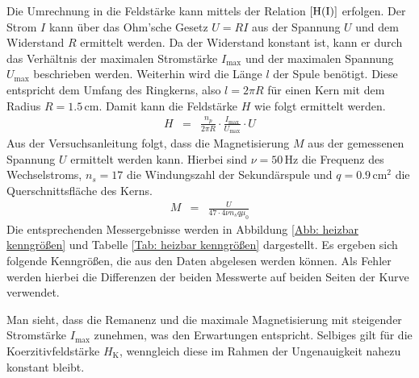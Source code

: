 \documentclass[12pt,a4paper]{scrartcl}
\numberwithin{equation}{section} %
\begin{document}
Die Umrechnung in die Feldstärke kann mittels der Relation $\eqref{H(I)}$ erfolgen. Der Strom $I$ kann über das Ohm'sche Gesetz $U=RI$ aus der Spannung $U$ und dem Widerstand $R$ ermittelt werden. Da der Widerstand konstant ist, kann er durch das Verhältnis der maximalen Stromstärke $I_\mathrm{max}$ und der maximalen Spannung $U_\mathrm{max}$ beschrieben werden. Weiterhin wird die Länge $l$ der Spule benötigt. Diese entspricht dem Umfang des Ringkerns, also $l=2\pi R$ für einen Kern mit dem Radius $R=1.5\mathrm{\,cm}$. Damit kann die Feldstärke $H$ wie folgt ermittelt werden.
\begin{eqnarray}
    H &=&
        \frac{n_p}{2\pi R} \cdot \frac{I_\mathrm{max}}{U_\mathrm{max}} \cdot U
        \label{H}
\end{eqnarray}
Aus der Versuchsanleitung \cite{Uni} folgt, dass die Magnetisierung $M$ aus der gemessenen Spannung $U$ ermittelt werden kann. Hierbei sind $\nu=\mathrm{50\,Hz}$ die Frequenz des Wechselstroms, $n_s=17$ die Windungszahl der Sekundärspule und $q = \mathrm{0.9\,cm^2}$ die
Querschnittsfläche des Kerns.
\begin{eqnarray}
    M &=&
        \frac{U}{47\cdot 4\nu n_s q \mu_0}
        \label{M}
\end{eqnarray}
Die entsprechenden Messergebnisse werden in Abbildung \ref{Abb: heizbar kenngrößen} und Tabelle \ref{Tab: heizbar kenngrößen} dargestellt. Es ergeben sich folgende Kenngrößen, die aus den Daten abgelesen werden können. Als Fehler werden hierbei die Differenzen der beiden Messwerte auf beiden Seiten der Kurve verwendet.

Man sieht, dass die Remanenz und die maximale Magnetisierung mit
steigender Stromstärke $I_\mathrm{max}$ zunehmen, was den Erwartungen
entspricht. Selbiges gilt für die Koerzitivfeldstärke $H_\mathrm{K}$,
wenngleich diese im Rahmen der Ungenauigkeit nahezu konstant bleibt.
\end{document}

